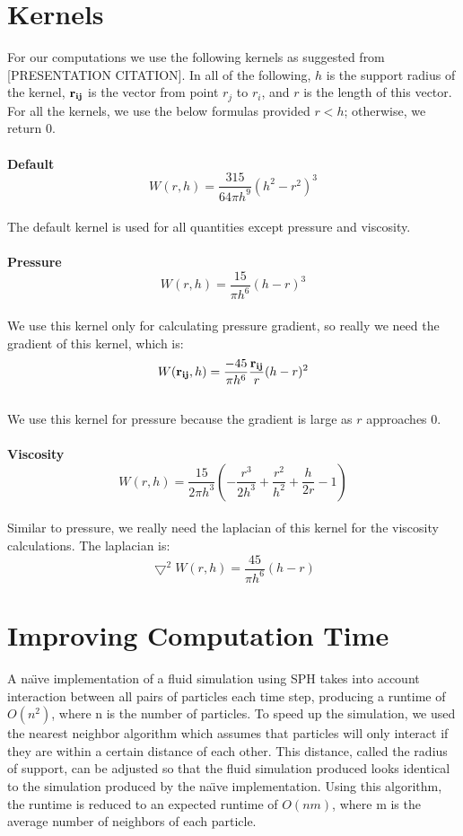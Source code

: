 \documentclass[11pt]{article}
\begin{document}
\section*{Kernels}
For our computations we use the following kernels as suggested from [PRESENTATION CITATION]. In all of the following, $h$ is the support radius of the kernel, ${\bf r_{ij}}$ is the vector from point $r_j$ to $r_i$, and $r$ is the length of this vector. For all the kernels, we use the below formulas provided $r<h$; otherwise, we return $0$.\\ \\
{\bf Default}
$$W(r,h) = \frac{315}{64\pi h^9}(h^2 - r^2)^3 $$ \\
The default kernel is used for all quantities except pressure and viscosity.
\\
\\
{\bf Pressure}
$$ W(r,h) = \frac{15}{\pi h^6}(h-r)^3$$
\\
We use this kernel only for calculating pressure gradient, so really we need the gradient of this kernel, which is:
\\
$$ W({\bf r_{ij}},h) = \frac{-45}{\pi h^6}\frac{{\bf r_{ij}}}{r}(h-r)^2$$
\\
We use this kernel for pressure because the gradient is large as $r$ approaches $0$.
\\
\\
{\bf Viscosity}
$$W(r,h) = \frac{15}{2\pi h^3}(-\frac{r^3}{2h^3} + \frac{r^2}{h^2} + \frac{h}{2r} - 1) $$
\\
Similar to pressure, we really need the laplacian of this kernel for the viscosity calculations. The laplacian is:
\\
$$\bigtriangledown^2 W(r,h) = \frac{45}{\pi h^6}(h-r) $$


\section*{Improving Computation Time}
A  na\"{\i}ve implementation of a fluid simulation using SPH takes into account interaction between all pairs of particles each time step, producing a runtime of $O(n^2)$, where n is the number of particles. To speed up the simulation, we used the nearest neighbor algorithm which assumes that particles will only interact if they are within a certain distance of each other. This distance, called the radius of support, can be adjusted so that the fluid simulation produced looks identical to the simulation produced by the  na\"{\i}ve implementation. Using this algorithm, the runtime is reduced to an expected runtime of $O(nm)$, where m is the average number of neighbors of each particle.
\end{document}
